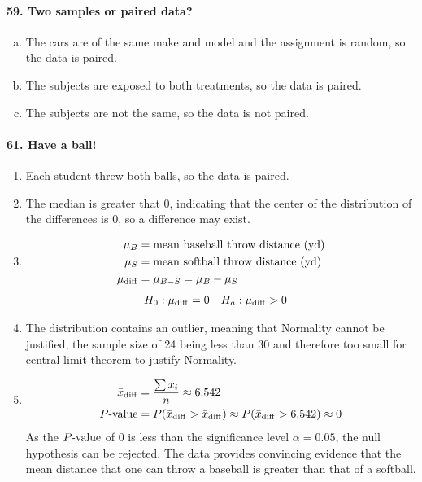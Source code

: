 \documentclass[../Homework]{subfiles}
\begin{document}
		\paragraph{59. Two samples or paired data?}
			\begin{enumerate}[a.]
				\item
					The cars are of the same make and model and the assignment is random, so the data is paired.
				\item
					The subjects are exposed to both treatments, so the data is paired.
				\item
					The subjects are not the same, so the data is not paired.
			\end{enumerate}
		\paragraph{61. Have a ball!}
			\begin{enumerate}
				\item
					Each student threw both balls, so the data is paired.
				\item
					The median is greater that 0, indicating that the center of the distribution of the differences is 0, so a difference may exist.
				\item
					\begin{align*}
						\mu_B &= \text{mean baseball throw distance (yd)} \\
						\mu_S &= \text{mean softball throw distance (yd)} \\
						\mu_{\mathrm{diff}} &= \mu_{B - S} = \mu_B - \mu_S
					\end{align*}
					\begin{align*}
						H_0&:\mu_{\mathrm{diff}} = 0 & H_a&:\mu_{\mathrm{diff}} > 0
					\end{align*}
				\item
					The distribution contains an outlier, meaning that Normality cannot be justified, the sample size of 24 being less than 30 and therefore too small for central limit theorem to justify Normality.
				\item
					\begin{align*}
						\bar{x}_{\mathrm{diff}} &= \frac{\sum x_i}{n} \approx 6.542 \\
						P\text{-value} &= P(\bar{x}_{\mathrm{diff}} > \bar{x}_{\mathrm{diff}}) \approx P(\bar{x}_{\mathrm{diff}} > 6.542) \approx 0
					\end{align*}
					As the $P\text{-value}$ of 0 is less than the significance level $\alpha = 0.05$, the null hypothesis can be rejected. The data provides convincing evidence that the mean distance that one can throw a baseball is greater than that of a softball.
			\end{enumerate}
\end{document}
